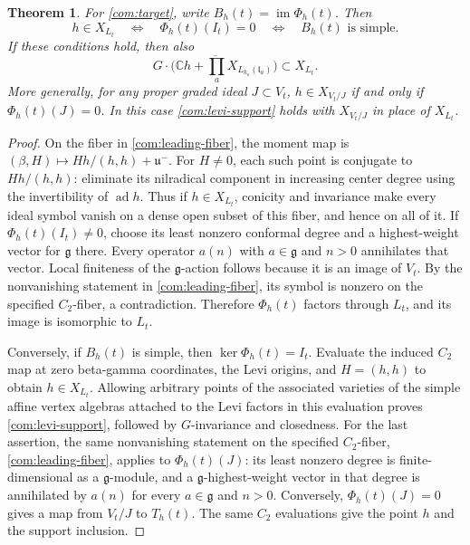\documentclass[11pt,a4paper]{amsart}
\numberwithin{equation}{section}
\newtheorem{theorem}{Theorem}[section]
\theoremstyle{definition}
\theoremstyle{remark}
\newcommand{\C}{\mathbb C}
\newcommand{\g}{\mathfrak g}
\newcommand{\uu}{\mathfrak u}
\newcommand{\lev}{\mathfrak l}
\newcommand{\im}{\operatorname{im}}
\newcommand{\ad}{\operatorname{ad}}
\begin{document}
\begin{theorem}\label{com:point-map}
For \eqref{com:target}, write $B_h(t)=\im\Phi_h(t)$. Then
\begin{equation}\label{com:point-equivalence}
 h\in X_{L_t}\quad\Longleftrightarrow\quad
 \Phi_h(t)(I_t)=0\quad\Longleftrightarrow\quad B_h(t)\text{ is simple}.
\end{equation}
If these conditions hold, then also
\begin{equation}\label{com:levi-support}
 \overline{G\cdot\bigg(\C h+
       \prod_a X_{L_{k_a}(\lev_a)}\bigg)}\subset X_{L_t}.
\end{equation}
More generally, for any proper graded ideal $J\subset V_t$,
$h\in X_{V_t/J}$ if and only if $\Phi_h(t)(J)=0$.
In this case \eqref{com:levi-support} holds with $X_{V_t/J}$
in place of $X_{L_t}$.
\end{theorem}
\begin{proof}
On the fiber in \cref{com:leading-fiber}, the moment map is
$(\beta,H)\mapsto Hh/(h,h)+\uu^-$. For $H\ne0$, each such point
is conjugate to $Hh/(h,h)$: eliminate its nilradical component in
increasing center degree using the invertibility of $\ad h$.
Thus if $h\in X_{L_t}$, conicity and invariance make every ideal
symbol vanish on a dense open subset of this fiber, and hence on all
of it. If $\Phi_h(t)(I_t)\ne0$, choose its least nonzero conformal
degree and a highest-weight vector for $\g$ there. Every operator $a(n)$ with $a\in\g$ and $n>0$
annihilates that vector. Local finiteness of the $\g$-action follows because it is
an image of $V_t$. By the nonvanishing statement in \cref{com:leading-fiber},
its symbol is nonzero on the specified $C_2$-fiber, a contradiction. Therefore $\Phi_h(t)$ factors through
$L_t$, and its image is isomorphic to $L_t$.

Conversely, if $B_h(t)$ is simple, then $\ker\Phi_h(t)=I_t$. Evaluate the
induced $C_2$ map at zero beta-gamma coordinates, the Levi origins,
and $H=(h,h)$ to obtain $h\in X_{L_t}$. Allowing arbitrary points
of the associated varieties of the simple affine vertex algebras attached
to the Levi factors in this evaluation proves
\eqref{com:levi-support}, followed by $G$-invariance and closedness.
For the last assertion, the same nonvanishing statement on the specified
$C_2$-fiber, \cref{com:leading-fiber}, applies to $\Phi_h(t)(J)$: its least nonzero degree is finite-dimensional as a $\g$-module,
and a $\g$-highest-weight vector in that degree is annihilated by
$a(n)$ for every $a\in\g$ and $n>0$.
Conversely, $\Phi_h(t)(J)=0$ gives a map from $V_t/J$ to $T_h(t)$.
The same $C_2$ evaluations give the point $h$ and the support inclusion.
\end{proof}
\end{document}
